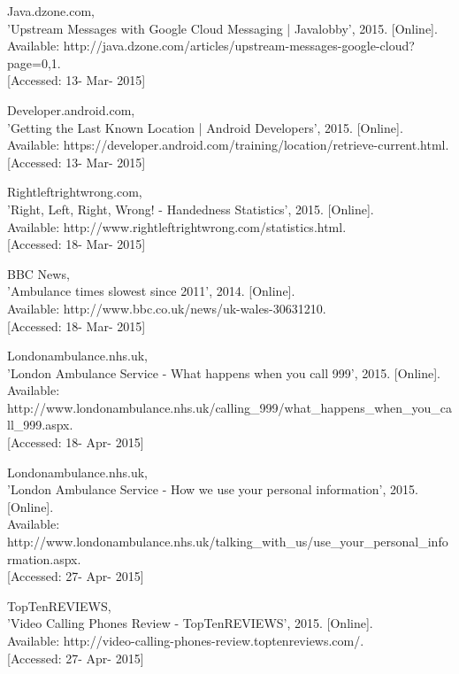 \documentclass[]{article}
\begin{document}
\begin{enumerate}[label={[\arabic*]}]
\item  Java.dzone.com, \\{}'Upstream Messages with Google Cloud Messaging | Javalobby', 2015. [Online]. \\{}Available: http://java.dzone.com/articles/upstream-messages-google-cloud?page=0,1. \\{}[Accessed: 13- Mar- 2015]

\item  Developer.android.com, \\{}'Getting the Last Known Location | Android Developers', 2015. [Online].\\{} Available: https://developer.android.com/training/location/retrieve-current.html. \\{}[Accessed: 13- Mar- 2015]

\item  Rightleftrightwrong.com, \\{}'Right, Left, Right, Wrong! - Handedness Statistics', 2015. [Online].\\{} Available: http://www.rightleftrightwrong.com/statistics.html.\\{} [Accessed: 18- Mar- 2015]

\item  BBC News, \\{}'Ambulance times slowest since 2011', 2014. [Online].\\{} Available: http://www.bbc.co.uk/news/uk-wales-30631210. \\{}[Accessed: 18- Mar- 2015]

\item  Londonambulance.nhs.uk, \\{}'London Ambulance Service - What happens when you call 999', 2015. [Online].\\{} Available: http://www.londonambulance.nhs.uk/calling\_999/what\_happens\_when\_you\_call\_999.aspx. \\{}[Accessed: 18- Apr- 2015]

\item  Londonambulance.nhs.uk,\\{} 'London Ambulance Service - How we use your personal information', 2015. [Online].\\{} Available: http://www.londonambulance.nhs.uk/talking\_with\_us/use\_your\_personal\_information.aspx. \\{}[Accessed: 27- Apr- 2015]

\item  TopTenREVIEWS,\\{} 'Video Calling Phones Review - TopTenREVIEWS', 2015. [Online]. \\{}Available: http://video-calling-phones-review.toptenreviews.com/.\\{} [Accessed: 27- Apr- 2015]


\end{enumerate}
\end{document}
